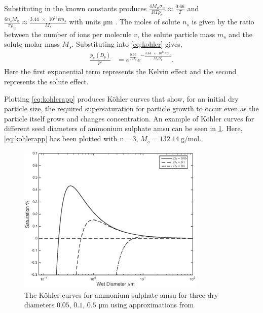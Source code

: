 			Substituting in the known constants produces $\frac{4 M_w \sigma_w}{R T \rho_w} \approx \frac{0.66}{T}$ and $\frac{6 n_s M_w}{\pi \rho_w} \approx \frac{\num{3.44e13} v m_s}{M_s}$ with units \si{\micro\meter} \citep[p. 770]{seinfeld2012atmospheric}. The moles of solute $n_s$ is given by the ratio between the number of ions per molecule $v$, the solute particle mass $m_s$ and the solute molar mass $M_s$. Substituting into \cref{eq:kohler} gives,
			\begin{align}
				\frac{p_w(D_p)}{p^\circ} &= e^{\frac{0.66}{T D_p}} e^{-\frac{\num{3.44e13} v m_s}{M_s D_p^3}}.
				\label{eq:kohlerapp}
			\end{align}
			Here the first exponential term represents the Kelvin effect and the second represents the solute effect.

			Plotting \cref{eq:kohlerapp} produces K\"{o}hler curves that show, for an initial dry particle size, the required supersaturation for particle growth to occur even as the particle itself grows and changes concentration. An example of K\"{o}hler curves for different seed diameters of ammonium sulphate \gls{amsu} can be seen in \cref{fig:kohleras}. Here, \cref{eq:kohlerapp} has been plotted with $v = 3$, $M_s = \SI{132.14}{\gram\per\mole}$.

			\begin{figure}[!htb]
			    \centering
			    \includegraphics[width=0.8\textwidth]{Fig/Literature_Review/as_Kcurve.eps}
			    \caption{The K\"{o}hler curves for ammonium sulphate \gls{amsu} for three dry diameters $0.05$, $0.1$, $0.5$ \si{\micro\meter} using approximations from \citet[p. 770]{seinfeld2012atmospheric} }
			    \label{fig:kohleras}
			\end{figure}

